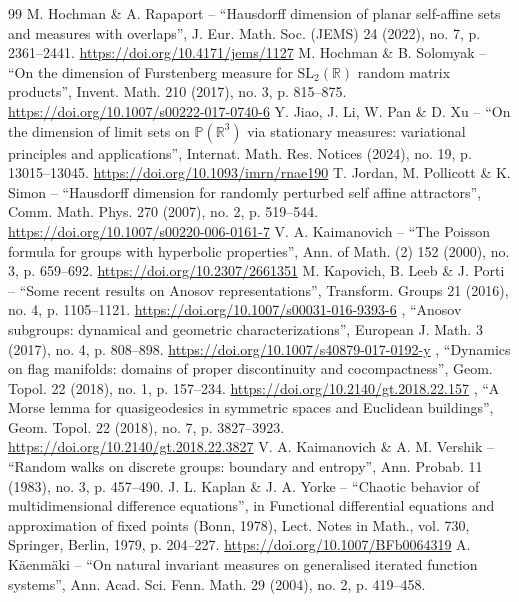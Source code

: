 \documentclass[10pt,a4paper]{amsart}
\begin{document}
\begin{thebibliography}{99}
 M. Hochman \& A. Rapaport – “Hausdorff dimension of planar self-affine sets and measures with overlaps”, J. Eur. Math. Soc. (JEMS) 24 (2022), no. 7, p. 2361–2441. \url{https://doi.org/10.4171/jems/1127}
 M. Hochman \& B. Solomyak – “On the dimension of Furstenberg measure for $\mathrm{SL}_2(\mathbb{R})$ random matrix products”, Invent. Math. 210 (2017), no. 3, p. 815–875. \url{https://doi.org/10.1007/s00222-017-0740-6}
 Y. Jiao, J. Li, W. Pan \& D. Xu – “On the dimension of limit sets on $\mathbb{P} (\mathbb{R}^3)$ via stationary measures: variational principles and applications”, Internat. Math. Res. Notices (2024), no. 19, p. 13015–13045. \url{https://doi.org/10.1093/imrn/rnae190}
 T. Jordan, M. Pollicott \& K. Simon – “Hausdorff dimension for randomly perturbed self affine attractors”, Comm. Math. Phys. 270 (2007), no. 2, p. 519–544. \url{https://doi.org/10.1007/s00220-006-0161-7}
 V. A. Kaimanovich – “The Poisson formula for groups with hyperbolic properties”, Ann. of Math. (2) 152 (2000), no. 3, p. 659–692. \url{https://doi.org/10.2307/2661351}
 M. Kapovich, B. Leeb \& J. Porti – “Some recent results on Anosov representations”, Transform. Groups 21 (2016), no. 4, p. 1105–1121. \url{https://doi.org/10.1007/s00031-016-9393-6}
 \textemdash{}, “Anosov subgroups: dynamical and geometric characterizations”, European J. Math. 3 (2017), no. 4, p. 808–898. \url{https://doi.org/10.1007/s40879-017-0192-y}
 \textemdash{}, “Dynamics on flag manifolds: domains of proper discontinuity and cocompactness”, Geom. Topol. 22 (2018), no. 1, p. 157–234. \url{https://doi.org/10.2140/gt.2018.22.157}
 \textemdash{}, “A Morse lemma for quasigeodesics in symmetric spaces and Euclidean buildings”, Geom. Topol. 22 (2018), no. 7, p. 3827–3923. \url{https://doi.org/10.2140/gt.2018.22.3827}
 V. A. Kaimanovich \& A. M. Vershik – “Random walks on discrete groups: boundary and entropy”, Ann. Probab. 11 (1983), no. 3, p. 457–490. 
 J. L. Kaplan \& J. A. Yorke – “Chaotic behavior of multidimensional difference equations”, in Functional differential equations and approximation of fixed points (Bonn, 1978), Lect. Notes in Math., vol. 730, Springer, Berlin, 1979, p. 204–227. \url{https://doi.org/10.1007/BFb0064319}
 A. Käenmäki – “On natural invariant measures on generalised iterated function systems”, Ann. Acad. Sci. Fenn. Math. 29 (2004), no. 2, p. 419–458. 

\end{thebibliography}
\end{document}
